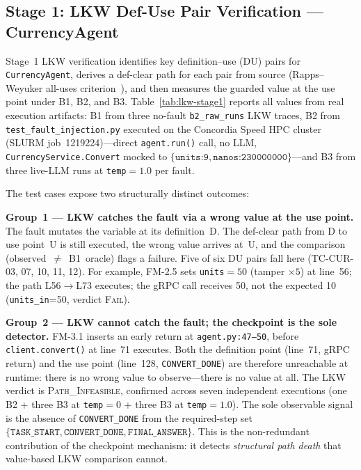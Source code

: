 \documentclass[sigconf,review,anonymous,balance=false]{acmart}
\begin{document}
\subsection{Stage 1: LKW Def-Use Pair Verification --- CurrencyAgent}
\label{sec:lkw-stage1-currency}

Stage~1 LKW verification identifies key definition--use (DU) pairs for
\texttt{CurrencyAgent}, derives a def-clear path for each pair from source
(Rapps--Weyuker all-uses criterion~\cite{rapps-weyuker}), and then measures
the guarded value at the use point under B1, B2, and B3.
Table~\ref{tab:lkw-stage1} reports all values from real execution artifacts:
B1 from three no-fault \texttt{b2\_raw\_runs} LKW traces,
B2 from \texttt{test\_fault\_injection.py} executed on the Concordia Speed
HPC cluster (SLURM job~1219224)---direct \texttt{agent.run()} call,
no LLM, \texttt{CurrencyService.Convert} mocked to
$\{\texttt{units:9},\texttt{nanos:230000000}\}$---and
B3 from three live-LLM runs at \texttt{temp}$=1.0$ per fault.

The test cases expose two structurally distinct outcomes:

\textbf{Group~1 --- LKW catches the fault via a wrong value at the use
point.}
The fault mutates the variable at its definition~D\@.
The def-clear path from D to use point~U is still executed, the wrong value
arrives at~U, and the comparison (observed~$\neq$~B1~oracle) flags a
failure.
Five of six DU pairs fall here (TC-CUR-03, 07, 10, 11, 12).
For example, FM-2.5 sets \texttt{units}$=50$ (tamper $\times5$) at
line~56; the path L56$\to$L73 executes; the gRPC call receives 50, not
the expected 10 (\texttt{units\_in}=50, verdict \textsc{Fail}).

\textbf{Group~2 --- LKW cannot catch the fault; the checkpoint is the
sole detector.}
FM-3.1 inserts an early return at \texttt{agent.py:47--50}, before
\texttt{client.convert()} at line~71 executes.
Both the definition point (line~71, gRPC return) and the use point
(line~128, \texttt{CONVERT\_DONE}) are therefore unreachable at runtime:
there is no wrong value to observe---there is no value at all.
The LKW verdict is \textsc{Path\_Infeasible}, confirmed across seven
independent executions (one B2 + three B3 at \texttt{temp}$=0$ + three B3 at \texttt{temp}$=1.0$).
The sole observable signal is the absence of \texttt{CONVERT\_DONE} from
the required-step set
$\{\texttt{TASK\_START},\allowbreak\texttt{CONVERT\_DONE},\allowbreak%
\texttt{FINAL\_ANSWER}\}$.
This is the non-redundant contribution of the checkpoint mechanism: it
detects \emph{structural path death} that value-based LKW comparison
cannot.
\end{document}
